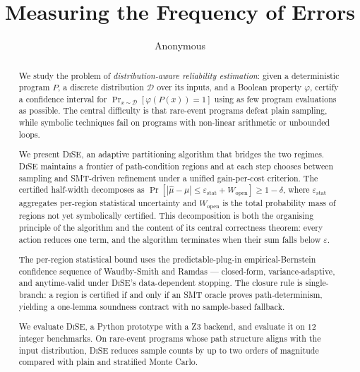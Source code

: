 \documentclass[runningheads]{llncs}
\newcommand{\dist}{\mathcal{D}}
\newcommand{\prog}{P}
\newcommand{\prop}{\varphi}
\newcommand{\mutrue}{\mu}
\newcommand{\muhat}{\hat{\mu}}
\newcommand{\Wopen}{W_{\mathrm{open}}}
\newcommand{\epsstat}{\varepsilon_{\mathrm{stat}}}
\newcommand{\toolname}{\textsc{DiSE}}
\begin{document}
\title{Measuring the Frequency of Errors}


\author{Anonymous}

\maketitle

\begin{abstract}
  We study the problem of \emph{distribution-aware reliability
    estimation}: given a deterministic program $\prog$, a discrete
  distribution $\dist$ over its inputs, and a Boolean property
  $\prop$, certify a confidence interval for
  $\Pr_{x \sim \dist}[\prop(\prog(x)) = 1]$ using as few program
  evaluations as possible.  The central difficulty is that
  rare-event programs defeat plain sampling, while symbolic
  techniques fail on programs with non-linear arithmetic or
  unbounded loops.

  We present \toolname{}, an adaptive partitioning algorithm that
  bridges the two regimes.
  \toolname{} maintains a frontier of path-condition regions and at
  each step chooses between sampling and SMT-driven refinement under
  a unified gain-per-cost criterion.  The certified half-width
  decomposes as
  $\Pr[|\muhat - \mutrue| \le \epsstat + \Wopen] \ge 1 - \delta$,
  where $\epsstat$ aggregates per-region statistical uncertainty and
  $\Wopen$ is the total probability mass of regions not yet
  symbolically certified.  This decomposition is both the organising
  principle of the algorithm and the content of its central
  correctness theorem: every action reduces one term, and the
  algorithm terminates when their sum falls below $\varepsilon$.

  The per-region statistical bound uses the predictable-plug-in
  empirical-Bernstein confidence sequence of Waudby-Smith and Ramdas
  --- closed-form, variance-adaptive, and anytime-valid under
  \toolname{}'s data-dependent stopping.  The closure rule is
  single-branch: a region is certified if and only if an SMT oracle
  proves path-determinism, yielding a one-lemma soundness contract
  with no sample-based fallback.

  We evaluate \toolname{}, a Python prototype with a
  Z3 backend, and evaluate it on $12$ integer benchmarks.  On
  rare-event programs whose path structure aligns with the input
  distribution, \toolname{} reduces sample counts by up to two orders
  of magnitude compared with plain and stratified Monte Carlo.
\end{abstract}
\end{document}

